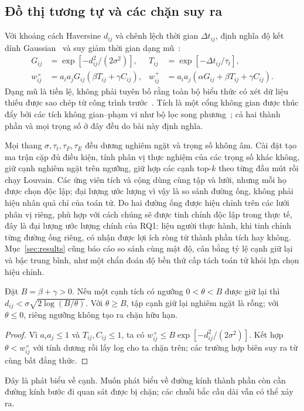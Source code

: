 \documentclass[runningheads]{llncs}
\begin{document}
\subsection{Đồ thị tương tự và các chặn suy ra}

Với khoảng cách Haversine $d_{ij}$ và chênh lệch thời gian $\Delta t_{ij}$,
định nghĩa độ kết dính Gaussian~\cite{ng2001spectral} và suy giảm thời gian
dạng mũ~\cite{zhou2013triggering}:
\begin{align}
G_{ij}&=\exp[-d_{ij}^{2}/(2\sigma^2)],&
T_{ij}&=\exp[-\Delta t_{ij}/\tau_t],\nonumber\\
w^\times_{ij}&=a_i a_jG_{ij}(\beta T_{ij}+\gamma C_{ij}),&
w^+_{ij}&=a_i a_j(\alpha G_{ij}+\beta T_{ij}+\gamma C_{ij}).
\label{eq:similarities}
\end{align}
Dạng mũ là tiền lệ, không phải tuyên bố rằng toàn bộ biểu thức có xét dữ liệu
thiếu được sao chép từ công trình trước~\cite{billot2008exponential}. Tích
là một cổng không gian được thúc đẩy bởi các tích không gian--phạm vi như
bộ lọc song phương~\cite{tomasi1998bilateral}; cả hai thành phần và mọi
trọng số ở đây đều do bài này định nghĩa.

Mọi thang $\sigma,\tau_t,\tau_F,\tau_E$ đều dương nghiêm ngặt và trọng số
không âm. Cài đặt tạo ma trận cặp đủ điều kiện, tính phân vị thực nghiệm của
các trọng số khác không, giữ cạnh nghiêm ngặt trên ngưỡng, giữ hợp các cạnh
top-$k$ theo từng đầu mút rồi chạy Louvain. Các ứng viên tích và cộng dùng
cùng tập và lưới, nhưng mỗi họ được chọn độc lập; đại lượng ước lượng vì vậy
là so sánh đường ống, không phải hiệu nhân quả chỉ của toán tử. Do hai
đường ống được hiệu chỉnh trên các lưới phân vị riêng, phù hợp với cách
chúng sẽ được tinh chỉnh độc lập trong thực tế, đây là đại lượng ước lượng
chính của RQ1: liệu người thực hành, khi tinh chỉnh từng đường ống riêng,
có nhận được lợi ích ròng từ thành phần tích hay không. Mục~\ref{sec:results}
cũng báo cáo so sánh cùng mật độ, cân bằng tỷ lệ cạnh giữ lại và bậc trung
bình, như một chẩn đoán độ bền thứ cấp tách toán tử khỏi lựa chọn hiệu chỉnh.

\begin{theorem}
Đặt $B=\beta+\gamma>0$. Nếu một cạnh tích có ngưỡng $0<\theta<B$ được giữ
lại thì
$d_{ij}<\sigma\sqrt{2\log(B/\theta)}$. Với $\theta\ge B$, tập cạnh giữ lại
nghiêm ngặt là rỗng; với $\theta\le0$, riêng ngưỡng không tạo ra chặn hữu
hạn.
\end{theorem}
\begin{proof}
Vì $a_ia_j\le1$ và $T_{ij},C_{ij}\le1$, ta có
$w^\times_{ij}\le B\exp[-d_{ij}^{2}/(2\sigma^2)]$. Kết hợp
$\theta<w^\times_{ij}$ với tính dương rồi lấy log cho ta chặn trên; các
trường hợp biên suy ra từ cùng bất đẳng thức.
\end{proof}
Đây là phát biểu về cạnh. Muốn phát biểu về đường kính thành phần còn cần
đường kính bước đi quan sát được bị chặn; các chuỗi bắc cầu dài vẫn có thể
xảy ra.
\end{document}
